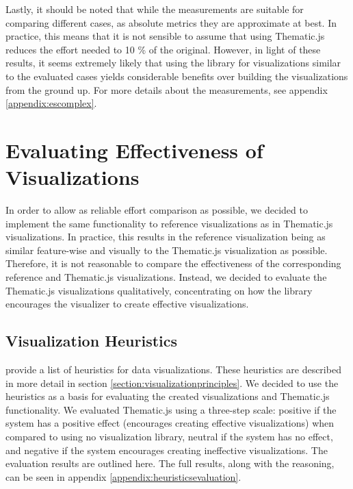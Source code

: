 Lastly, it should be noted that while the measurements are suitable for comparing different cases, as absolute metrics they are approximate at best. In practice, this means that it is not sensible to assume that using Thematic.js reduces the effort needed to 10 \% of the original. However, in light of these results, it seems extremely likely that using the library for visualizations similar to the evaluated cases yields considerable benefits over building the visualizations from the ground up. For more details about the measurements, see appendix \ref{appendix:escomplex}.


\section{Evaluating Effectiveness of Visualizations}

In order to allow as reliable effort comparison as possible, we decided to implement the same functionality to reference visualizations as in Thematic.js visualizations. In practice, this results in the reference visualization being as similar feature-wise and visually to the Thematic.js visualization as possible. Therefore, it is not reasonable to compare the effectiveness of the corresponding reference and Thematic.js visualizations. Instead, we decided to evaluate the Thematic.js visualizations qualitatively, concentrating on how the library encourages the visualizer to create effective visualizations.

\subsection{Visualization Heuristics}

\citet{zuk_heuristics_2006} provide a list of heuristics for data visualizations. These heuristics are described in more detail in section \ref{section:visualizationprinciples}. We decided to use the heuristics as a basis for evaluating the created visualizations and Thematic.js functionality. We evaluated Thematic.js using a three-step scale: positive if the system has a positive effect (encourages creating effective visualizations) when compared to using no visualization library, neutral if the system has no effect, and negative if the system encourages creating ineffective visualizations. The evaluation results are outlined here. The full results, along with the reasoning, can be seen in appendix \ref{appendix:heuristicsevaluation}.

